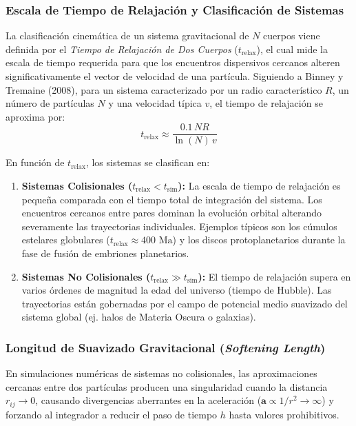 \documentclass[11pt, a4paper]{article}
\begin{document}
	\subsubsection{Escala de Tiempo de Relajación y Clasificación de Sistemas}
	La clasificación cinemática de un sistema gravitacional de $N$ cuerpos viene definida por el \textit{Tiempo de Relajación de Dos Cuerpos} ($t_{\text{relax}}$), el cual mide la escala de tiempo requerida para que los encuentros dispersivos cercanos alteren significativamente el vector de velocidad de una partícula. Siguiendo a Binney y Tremaine (2008), para un sistema caracterizado por un radio característico $R$, un número de partículas $N$ y una velocidad típica $v$, el tiempo de relajación se aproxima por:
	\begin{equation}
		t_{\text{relax}} \approx \frac{0.1 \, N R}{\ln(N) \, v}
		\label{eq:t_relax}
	\end{equation}
	
	En función de $t_{\text{relax}}$, los sistemas se clasifican en:
	\begin{enumerate}
		\item \textbf{Sistemas Colisionales ($t_{\text{relax}} < t_{\text{sim}}$):} La escala de tiempo de relajación es pequeña comparada con el tiempo total de integración del sistema. Los encuentros cercanos entre pares dominan la evolución orbital alterando severamente las trayectorias individuales. Ejemplos típicos son los cúmulos estelares globulares ($t_{\text{relax}} \approx 400 \text{ Ma}$) y los discos protoplanetarios durante la fase de fusión de embriones planetarios.
		\item \textbf{Sistemas No Colisionales ($t_{\text{relax}} \gg t_{\text{sim}}$):} El tiempo de relajación supera en varios órdenes de magnitud la edad del universo (tiempo de Hubble). Las trayectorias están gobernadas por el campo de potencial medio suavizado del sistema global (ej. halos de Materia Oscura o galaxias).
	\end{enumerate}
	
	\subsubsection{Longitud de Suavizado Gravitacional (\textit{Softening Length})}
	En simulaciones numéricas de sistemas no colisionales, las aproximaciones cercanas entre dos partículas producen una singularidad cuando la distancia $r_{ij} \to 0$, causando divergencias aberrantes en la aceleración ($\mathbf{a} \propto 1/r^2 \to \infty$) y forzando al integrador a reducir el paso de tiempo $h$ hasta valores prohibitivos. 
	
\end{document}
